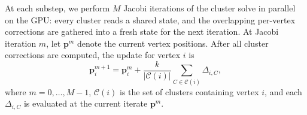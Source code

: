 \documentclass[letterpaper, 10 pt, conference]{ieeeconf}  %
\theoremstyle{tight}
\begin{document}
 

At each substep, we perform $M$ Jacobi iterations of the cluster solve in
parallel on the GPU: every cluster reads a shared state, and the overlapping
per-vertex corrections are gathered into a fresh state for the next iteration.
At Jacobi iteration $m$, let $\mathbf{p}^{m}$ denote the current vertex
positions. After all cluster corrections are computed, the update for vertex
$i$ is
\begin{equation}
  \mathbf{p}^{m+1}_i = \mathbf{p}^{m}_i +
    \frac{k}{|\mathcal{C}(i)|}\!\sum_{C \in \mathcal{C}(i)}
    \Delta_{i, C} ,
  \label{eq:apply}
\end{equation}
where $m=0,\ldots,M-1$, $\mathcal{C}(i)$ is the set of clusters containing
vertex $i$, and each $\Delta_{i, C}$ is evaluated at the current iterate
$\mathbf{p}^{m}$.

 
\end{document}
